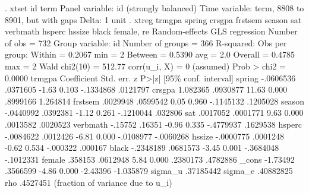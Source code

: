 . xtset id term
{\smallskip}
Panel variable: id (strongly balanced)
 Time variable: term, 8808 to 8901, but with gaps
         Delta: 1 unit
{\smallskip}
. xtreg trmgpa spring crsgpa frstsem season sat verbmath hsperc hssize black female, re
{\smallskip}
Random-effects GLS regression                   Number of obs     =        732
Group variable: id                              Number of groups  =        366
{\smallskip}
R-squared:                                      Obs per group:
     Within  = 0.2067                                         min =          2
     Between = 0.5390                                         avg =        2.0
     Overall = 0.4785                                         max =          2
{\smallskip}
                                                Wald chi2(10)     =     512.77
corr(u_i, X) = 0 (assumed)                      Prob > chi2       =     0.0000
{\smallskip}
      trmgpa {\VBAR} Coefficient  Std. err.      z    P>|z|     [95\% conf. interval]
      spring {\VBAR}  -.0606536   .0371605    -1.63   0.103    -.1334868    .0121797
      crsgpa {\VBAR}   1.082365   .0930877    11.63   0.000     .8999166    1.264814
     frstsem {\VBAR}   .0029948   .0599542     0.05   0.960    -.1145132    .1205028
      season {\VBAR}  -.0440992   .0392381    -1.12   0.261    -.1210044     .032806
         sat {\VBAR}   .0017052   .0001771     9.63   0.000     .0013582    .0020523
    verbmath {\VBAR}    -.15752     .16351    -0.96   0.335    -.4779937    .1629538
      hsperc {\VBAR}  -.0084622   .0012426    -6.81   0.000    -.0108977   -.0060268
      hssize {\VBAR}  -.0000775   .0001248    -0.62   0.534     -.000322     .000167
       black {\VBAR}  -.2348189   .0681573    -3.45   0.001    -.3684048   -.1012331
      female {\VBAR}    .358153   .0612948     5.84   0.000     .2380173    .4782886
       _cons {\VBAR}   -1.73492   .3566599    -4.86   0.000     -2.43396   -1.035879
     sigma_u {\VBAR}  .37185442
     sigma_e {\VBAR}  .40882825
         rho {\VBAR}   .4527451   (fraction of variance due to u_i)
{\smallskip}
